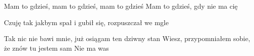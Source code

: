 \documentclass[../../../songbook.tex]{subfiles}
\begin{document}
\-\hspace{1cm} Mam to gdzieś, mam to gdzieś, mam to gdzieś		 \newline	
\-\hspace{1cm} Mam to gdzieś, gdy nie ma cię					 \newline	

Czuję tak jakbym spał i gubił się, rozpuszczał we mgle	 \newline	

\-\hspace{1cm} Tak nic nie bawi mnie, już osiągam ten dziwny stan	 \newline	
\-\hspace{1cm} Wiesz, przypomniałem sobie, że znów tu jestem sam	 \newline	
Nie ma was	 \newline	
\end{document}
